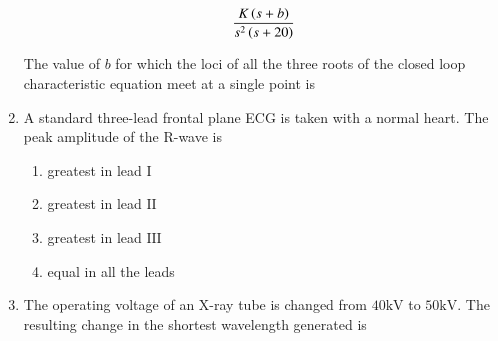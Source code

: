 \documentclass[journal,12pt,onecolumn]{IEEEtran}
\theoremstyle{remark}
\begin{document}
\begin{enumerate}
$$\frac{K\left(s+b\right)}{s^2\left(s+20\right)}$$\par

The value of $b$ for which the loci of all the three roots of the closed loop characteristic equation meet at a single point is \par \hfill{}
\begin{enumerate}
\end{enumerate} 

 

\item A standard three-lead frontal plane ECG is taken with a normal heart. The peak amplitude of the R-wave is \par \hfill{}
\begin{enumerate}
        \item greatest in lead $\mathrm{I}$
        \item greatest in lead $\mathrm{II}$
        \item greatest in lead $\mathrm{III}$
        \item equal in all the leads
\end{enumerate} 

 

\item The operating voltage of an X-ray tube is changed from $40\text{kV}$ to $50\text{kV}$. The resulting change in the shortest wavelength generated is \par \hfill{}
\begin{enumerate}
\end{enumerate}

 


\end{enumerate}
\end{document}
